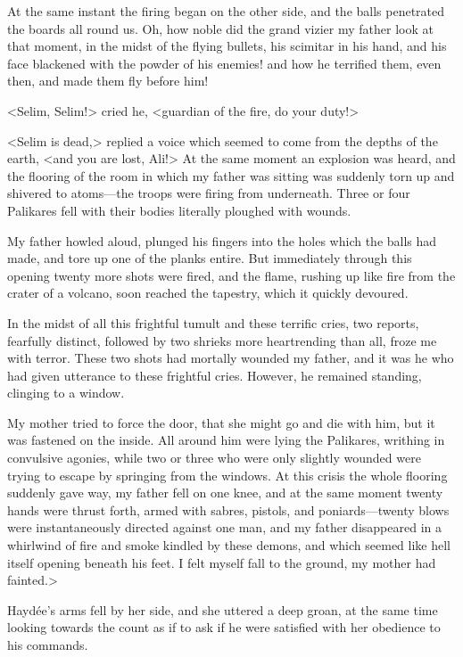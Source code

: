 At the same instant the firing began on the other side, and the balls penetrated the boards all round us. Oh, how noble did the grand vizier my father look at that moment, in the midst of the flying bullets, his scimitar in his hand, and his face blackened with the powder of his enemies! and how he terrified them, even then, and made them fly before him! 

<Selim, Selim!> cried he, <guardian of the fire, do your duty!>

<Selim is dead,> replied a voice which seemed to come from the depths of the earth, <and you are lost, Ali!> At the same moment an explosion was heard, and the flooring of the room in which my father was sitting was suddenly torn up and shivered to atoms—the troops were firing from underneath. Three or four Palikares fell with their bodies literally ploughed with wounds. 

 My father howled aloud, plunged his fingers into the holes which the balls had made, and tore up one of the planks entire. But immediately through this opening twenty more shots were fired, and the flame, rushing up like fire from the crater of a volcano, soon reached the tapestry, which it quickly devoured. 
 
 In the midst of all this frightful tumult and these terrific cries, two reports, fearfully distinct, followed by two shrieks more heartrending than all, froze me with terror. These two shots had mortally wounded my father, and it was he who had given utterance to these frightful cries. However, he remained standing, clinging to a window. 
 
 My mother tried to force the door, that she might go and die with him, but it was fastened on the inside. All around him were lying the Palikares, writhing in convulsive agonies, while two or three who were only slightly wounded were trying to escape by springing from the windows. At this crisis the whole flooring suddenly gave way, my father fell on one knee, and at the same moment twenty hands were thrust forth, armed with sabres, pistols, and poniards—twenty blows were instantaneously directed against one man, and my father disappeared in a whirlwind of fire and smoke kindled by these demons, and which seemed like hell itself opening beneath his feet. I felt myself fall to the ground, my mother had fainted.> 

 Haydée's arms fell by her side, and she uttered a deep groan, at the same time looking towards the count as if to ask if he were satisfied with her obedience to his commands. 


